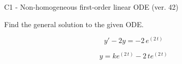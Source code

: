 \begin{exercise}
  \begin{exerciseTitle}C1 - Non-homogeneous first-order linear ODE (ver. 42)\end{exerciseTitle}
  \begin{exerciseStatement}
    
Find the general solution to the given ODE.

    
\[y'-2y= -2 \, e^{\left(2 \, t\right)}\]

  \end{exerciseStatement}
  \begin{exerciseAnswer}
    
\[y= k e^{\left(2 \, t\right)} - 2 \, t e^{\left(2 \, t\right)}\]

  \end{exerciseAnswer}
\end{exercise}
